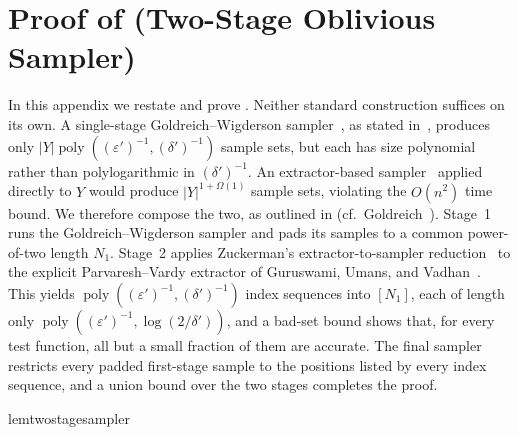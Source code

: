 \documentclass[11pt]{article}
\newcommand{\innercustomthm}{}
\theoremstyle{definition}
\renewcommand{\label}[1]{}%
\newcommand{\restatethm}[2]{%
  \begingroup
  \renewcommand{\innercustomthm}{\ref{#2}}%
  \csname #1\endcsname
  \endgroup
}
\newcommand{\poly}{\operatorname{poly}}
\newcommand{\abs}[1]{\left\lvert #1 \right\rvert}
\begin{document}
\section{Proof of \texorpdfstring{}{Lemma 3.3} (Two-Stage Oblivious Sampler)}
\label{app:sampler}

In this appendix we restate and prove . Neither standard construction suffices on its own. A single-stage Goldreich--Wigderson sampler~\cite{GoldreichW97}, as stated in~\cite[Lemma~4.4]{AFKLM24}, produces only $\abs{Y}\poly((\varepsilon')^{-1}, (\delta')^{-1})$ sample sets, but each has size polynomial rather than polylogarithmic in $(\delta')^{-1}$. An extractor-based sampler~\cite{Zuckerman97,GUV09} applied directly to $Y$ would produce $\abs{Y}^{1 + \Omega(1)}$ sample sets, violating the $O(n^2)$ time bound. We therefore compose the two, as outlined in  (cf.~Goldreich~\cite[Theorem~5.8]{Goldreich11}). Stage~1 runs the Goldreich--Wigderson sampler and pads its samples to a common power-of-two length $N_1$. Stage~2 applies Zuckerman's extractor-to-sampler reduction~\cite{Zuckerman97,Vadhan12} to the explicit Parvaresh--Vardy extractor of Guruswami, Umans, and Vadhan~\cite{GUV09}. This yields $\poly((\varepsilon')^{-1}, (\delta')^{-1})$ index sequences into $[N_1]$, each of length only $\poly((\varepsilon')^{-1}, \log(2/\delta'))$, and a bad-set bound shows that, for every test function, all but a small fraction of them are accurate. The final sampler restricts every padded first-stage sample to the positions listed by every index sequence, and a union bound over the two stages completes the proof.

\restatethm{lemtwostagesampler}{lem:two-stage-sampler}
\end{document}
